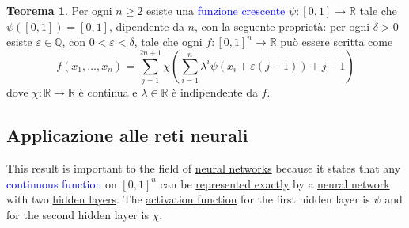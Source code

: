 \documentclass[10pt]{book}
\newcommand{\1}{\mathds{1}}
\newcommand{\R}{\mathds{R}}
\newcommand{\Q}{\mathds{Q}}
\theoremstyle{definition}%
\newtheorem{thm}{Teorema}[section]
\theoremstyle{plain}
\theoremstyle{remark}
\renewcommand{\href}[2]{\textcolor{blue}{#2}}
\begin{document}
\begin{thm}
Per ogni \(n\ge {2}\) esiste una \href{../../../../../org/roam/20250203132953-funzione_monotona.org}{funzione crescente} \(\psi:[0,1]\to \R\) tale che \(\psi\left([0,1]\right)=[0,1]\), dipendente da \(n\), con la seguente proprietà: per ogni \(\delta>0\) esiste \(\varepsilon \in \Q\), con \(0<\varepsilon<\delta\), tale che ogni \(f:[0,1]^{n}\to \R\) può essere scritta come
\begin{equation*}
f(x_{1},\dots,x_{n}) = \sum_{j=1}^{2n+1} \chi\left(
\sum_{i=1}^{n}\lambda^{i}\psi(x_{i}+\varepsilon(j-1)) +j-1
\right)
\end{equation*}
dove \(\chi:\R\to \R\) è continua e \(\lambda \in \R\) è indipendente da \(f\).
\label{thm10.3.2}
\end{thm}
\subsection{Applicazione alle reti neurali}
\label{sec:org3ab9c08}

This result is important to the field of \hyperref[sec:org599fe74]{neural networks} because it states that any \href{../../../../../org/roam/20250103103252-funzione_continua.org}{continuous function} on \([0,1]^{n}\) can be \hyperref[sec:orgc7d4890]{represented exactly} by a \hyperref[sec:org599fe74]{neural network} with two \hyperref[sec:org5035087]{hidden layers}. The \hyperref[sec:orge12b133]{activation function} for the first hidden layer is \(\psi\) and for the second hidden layer is \(\chi\).
\end{document}
